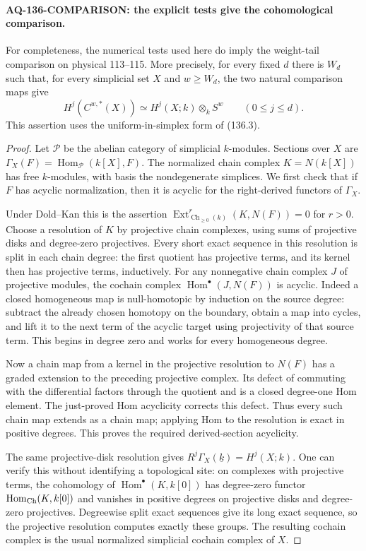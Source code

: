 \documentclass[11pt,a4paper]{article}
\theoremstyle{definition}\newtheorem{definition}[theorem]{Definition}
\theoremstyle{remark}\newtheorem{remark}[theorem]{Remark}
\begin{document}
\paragraph{AQ-136-COMPARISON: the explicit tests give the cohomological comparison.}
For completeness, the numerical tests used here do imply the
weight-tail comparison on physical 113--115.  More precisely,
for every fixed $d$ there is $W_d$ such that, for every simplicial
set $X$ and $w\geq W_d$, the two natural comparison maps give
\[
 H^j(C^{w,*}(X))\simeq H^j(X;k)\otimes_k S^w
                  \qquad(0\leq j\leq d).                  \tag{136.2}
\]
This assertion uses the uniform-in-simplex form of (136.3).

\begin{proof}
Let $\mathcal P$ be the abelian category of simplicial
$k$-modules.  Sections over $X$ are
$\Gamma_X(F)=\operatorname{Hom}_{\mathcal P}(k[X],F)$.
The normalized chain complex $K=N(k[X])$ has free $k$-modules,
with basis the nondegenerate simplices.  We first check that
if $F$ has acyclic normalization, then it is acyclic for the
right-derived functors of $\Gamma_X$.

Under Dold--Kan this is the assertion
$\operatorname{Ext}^r_{\operatorname{Ch}_{\geq0}(k)}
 (K,N(F))=0$ for $r>0$.
Choose a resolution of $K$ by projective chain complexes,
using sums of projective disks and degree-zero projectives.
Every short exact sequence in this resolution is split in
each chain degree: the first quotient has projective terms,
and its kernel then has projective terms, inductively.
For any nonnegative chain complex $J$ of projective modules,
the cochain complex $\operatorname{Hom}^{\bullet}(J,N(F))$
is acyclic.  Indeed a closed homogeneous map is
null-homotopic by induction on the source degree: subtract
the already chosen homotopy on the boundary, obtain a map
into cycles, and lift it to the next term of the acyclic
target using projectivity of that source term.  This begins
in degree zero and works for every homogeneous degree.

Now a chain map from a kernel in the projective resolution
to $N(F)$ has a graded extension to the preceding projective
complex.  Its defect of commuting with the differential
factors through the quotient and is a closed degree-one
Hom element.  The just-proved Hom acyclicity corrects this
defect.  Thus every such chain map extends as a chain map;
applying Hom to the resolution is exact in positive degrees.
This proves the required derived-section acyclicity.

The same projective-disk resolution gives
$R^j\Gamma_X(\underline{k})=H^j(X;k)$.
One can verify this without identifying a topological site:
on complexes with projective terms, the cohomology of
$\operatorname{Hom}^{\bullet}(K,k[0])$ has degree-zero
functor $\operatorname{Hom}_{\rm Ch}(K,k[0])$ and vanishes
in positive degrees on projective disks and degree-zero
projectives.  Degreewise split exact sequences give its
long exact sequence, so the projective resolution computes
exactly these groups.  The resulting cochain complex is
the usual normalized simplicial cochain complex of $X$.


\end{proof}
\end{document}
